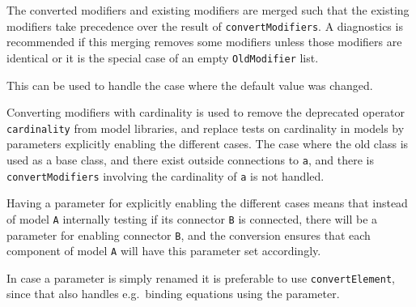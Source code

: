The converted modifiers and existing modifiers are merged such that the existing modifiers take precedence over the result of \lstinline!convertModifiers!.
A diagnostics is recommended if this merging removes some modifiers unless those modifiers are identical or it is the special case of an empty \lstinline!OldModifier! list.
\begin{nonnormative}
This can be used to handle the case where the default value was changed.
\end{nonnormative}

Converting modifiers with cardinality is used to remove the deprecated operator \lstinline!cardinality! from model libraries, and replace tests on cardinality in models by parameters explicitly enabling the different cases.
The case where the old class is used as a base class, and there exist outside connections to \lstinline!a!, and there is \lstinline!convertModifiers! involving the cardinality of \lstinline!a! is not handled.

\begin{nonnormative}
Having a parameter for explicitly enabling the different cases means that instead of model \lstinline!A! internally testing if its
connector \lstinline!B! is connected, there will be a parameter for enabling connector \lstinline!B!, and the conversion ensures that
each component of model \lstinline!A! will have this parameter set accordingly.

In case a parameter is simply renamed it is preferable to use \lstinline!convertElement!, since that also handles e.g.\ binding equations
using the parameter.
\end{nonnormative}


